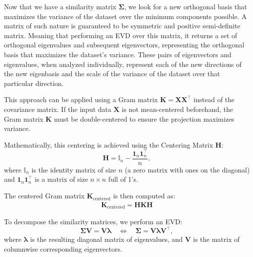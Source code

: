             Now that we have a similarity matrix $\boldsymbol{\Sigma}$, we look for a new orthogonal basis that maximizes the variance of the dataset over the minimum components possible. A matrix of such nature is guaranteed to be symmetric and positive semi-definite matrix. Meaning that performing an \ac{EVD} over this matrix, it returns a set of orthogonal eigenvalues and subsequent eigenvectors, representing the orthogonal basis that maximizes the dataset's variance. These pairs of eigenvectors and eigenvalues, when analyzed individually, represent each of the new directions of the new eigenbasis and the scale of the variance of the dataset over that particular direction.

            This approach can be applied using a Gram matrix $\boldsymbol{K}=\boldsymbol{XX}^\top$ instead of the covariance matrix. If the input data $\boldsymbol{X}$ is not mean-centered beforehand, the Gram matrix $\boldsymbol{K}$ must be double-centered to ensure the projection maximizes variance.

            Mathematically, this centering is achieved using the Centering Matrix $\boldsymbol{H}$:
            \begin{equation}
                \boldsymbol{H} = \mathbb{I}_n - \frac{\boldsymbol{1}_n\boldsymbol{1}_n^\top}{n},
                \label{centering matrix}
            \end{equation}
            where $\mathbb{I}_n$ is the identity matrix of size $n$ (a zero matrix with ones on the diagonal) and $\boldsymbol{1}_n\boldsymbol{1}_n^\top$ is a matrix of size $n\times n$ full of 1's.

            The centered Gram matrix $\boldsymbol{K}_{\text{centered}}$ is then computed as:
            \begin{align}
                \boldsymbol{K}_{\text{centered}} = \boldsymbol{HKH}
                \label{eq:double-centering}
            \end{align}

            To decompose the similarity matrices, we perform an \ac{EVD}:
            \begin{equation}
                \boldsymbol{\Sigma V} = \boldsymbol{V\lambda}
                \quad \iff \quad
                \boldsymbol{\Sigma} = \boldsymbol{V\lambda V}^\top
                \label{eq:EVD},
            \end{equation}
            where $\boldsymbol{\lambda}$ is the resulting diagonal matrix of eigenvalues, and $\boldsymbol{V}$ is the matrix of columnwise corresponding eigenvectors.

